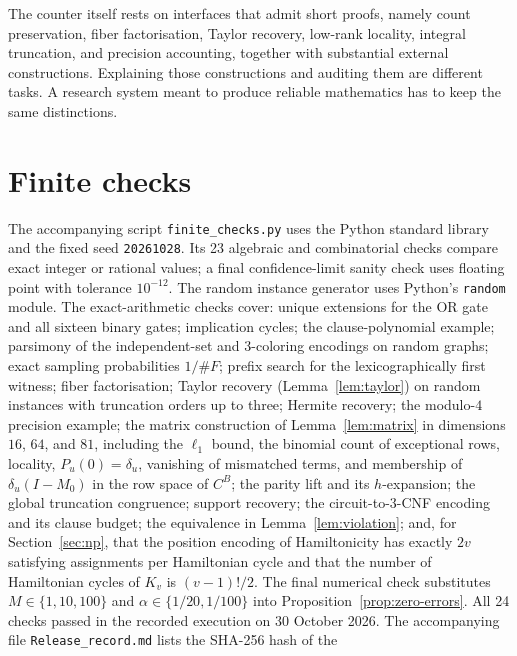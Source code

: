 \documentclass[11pt,reqno]{amsart}
\numberwithin{equation}{section}
\theoremstyle{plain}
\theoremstyle{definition}
\theoremstyle{remark}
\begin{document}
The counter itself rests on interfaces that admit short proofs, namely count
preservation, fiber factorisation, Taylor recovery, low-rank locality,
integral truncation, and precision accounting, together with substantial
external constructions. Explaining those constructions and auditing them are
different tasks. A research system meant to produce reliable mathematics has
to keep the same distinctions.


\appendix

\section{Finite checks}\label{app:checks}
The accompanying script \texttt{finite\_checks.py} uses the Python
standard library and the fixed seed \texttt{20261028}. Its 23 algebraic and
combinatorial checks compare exact integer or rational values; a final
confidence-limit sanity check uses floating point with tolerance $10^{-12}$.
The random instance generator uses Python's \texttt{random} module.
The exact-arithmetic checks cover: unique
extensions for the OR gate and all sixteen binary gates; implication cycles;
the clause-polynomial example; parsimony of the independent-set and
3-coloring encodings on random graphs; exact sampling probabilities $1/\#F$;
prefix search for the lexicographically first witness; fiber factorisation;
Taylor recovery (Lemma~\ref{lem:taylor}) on random instances with truncation
orders up to three; Hermite recovery; the modulo-$4$ precision example; the
matrix construction of Lemma~\ref{lem:matrix} in dimensions $16$, $64$, and
$81$, including the $\ell_1$ bound, the binomial count of exceptional rows,
locality, $P_u(0)=\delta_u$, vanishing of mismatched terms, and membership
of $\delta_u(I-M_0)$ in the row space of $C^B$; the parity lift and its
$h$-expansion; the global truncation congruence; support recovery; the
circuit-to-3-CNF encoding and its clause budget; the equivalence in
Lemma~\ref{lem:violation}; and, for Section~\ref{sec:np}, that the
position encoding of Hamiltonicity has exactly $2v$ satisfying assignments
per Hamiltonian cycle and that the number of Hamiltonian cycles of $K_v$ is
$(v-1)!/2$. The final numerical check substitutes $M\in\{1,10,100\}$ and
$\alpha\in\{1/20,1/100\}$ into Proposition~\ref{prop:zero-errors}.
All 24 checks passed in the recorded execution on 30 October 2026. The
accompanying file \texttt{Release\_record.md} lists the SHA-256 hash of the
\end{document}
